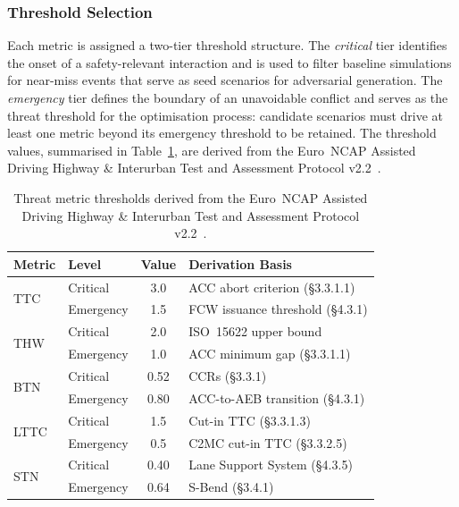 \subsubsection{Threshold Selection}
\label{sec:thresholds}
Each metric is assigned a two-tier threshold structure. The \textit{critical} tier identifies the onset of a safety-relevant interaction and is used to filter baseline simulations for near-miss events that serve as seed scenarios for adversarial generation. The \textit{emergency} tier defines the boundary of an unavoidable conflict and serves as the threat threshold for the optimisation process: candidate scenarios must drive at least one metric beyond its emergency threshold to be retained. The threshold values, summarised in Table~\ref{tab:thresholds}, are derived from the Euro~NCAP Assisted Driving Highway \& Interurban Test and Assessment Protocol v2.2~\cite{noauthor_euro_nodate}.

\begin{table}[htbp]
\centering
\caption{Threat metric thresholds derived from the Euro~NCAP Assisted Driving Highway \& Interurban Test and Assessment Protocol v2.2~\cite{noauthor_euro_nodate}.}
\label{tab:thresholds}
\renewcommand{\arraystretch}{1.0}
\begin{tabular}{@{}llcl@{}}
\toprule
\textbf{Metric} & \textbf{Level} & \textbf{Value} & \textbf{Derivation Basis} \\
\midrule
\multirow{2}{*}{TTC}
  & Critical  & 3.0  & ACC abort criterion (\S3.3.1.1)          \\
  & Emergency & 1.5  & FCW issuance threshold (\S4.3.1)         \\
\multirow{2}{*}{THW}
  & Critical  & 2.0  & ISO~15622 upper bound   \\
  & Emergency & 1.0  & ACC minimum gap (\S3.3.1.1)   \\
\multirow{2}{*}{BTN}
  & Critical  & 0.52 & CCRs (\S3.3.1) \\
  & Emergency & 0.80 & ACC-to-AEB transition (\S4.3.1)   \\
\multirow{2}{*}{LTTC}
  & Critical  & 1.5  & Cut-in TTC (\S3.3.1.3)   \\
  & Emergency & 0.5  & C2MC cut-in TTC (\S3.3.2.5) \\
\multirow{2}{*}{STN}
  & Critical  & 0.40 & Lane Support System (\S4.3.5) \\
  & Emergency & 0.64 & S-Bend (\S3.4.1) \\
\bottomrule
\end{tabular}
\end{table}

